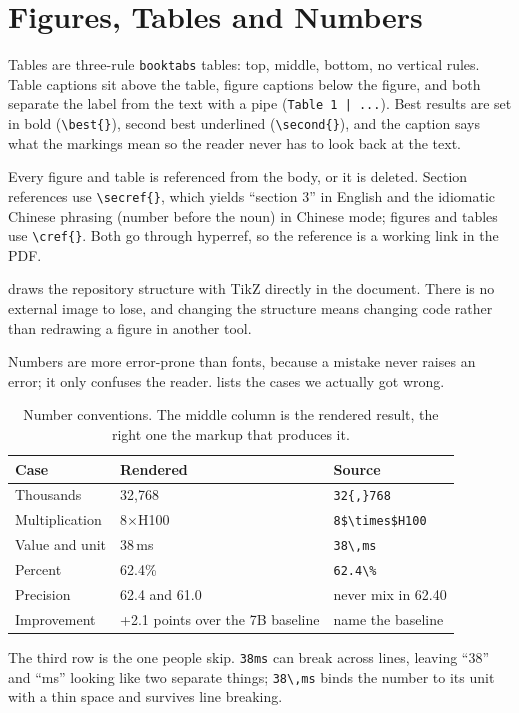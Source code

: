 \section{Figures, Tables and Numbers}
\label{sec:figure}

Tables are three-rule \texttt{booktabs} tables: top, middle, bottom, no vertical rules.
Table captions sit above the table, figure captions below the figure, and both separate
the label from the text with a pipe (\texttt{Table 1 | ...}). Best results are set in
bold (\verb|\best{}|), second best underlined (\verb|\second{}|), and the caption says
what the markings mean so the reader never has to look back at the text.

Every figure and table is referenced from the body, or it is deleted. Section references
use \verb|\secref{}|, which yields ``section 3'' in English and the idiomatic
Chinese phrasing (number before the noun) in Chinese mode; figures and tables use
\verb|\cref{}|. Both go through hyperref, so the reference is a working link in the PDF.

 draws the repository structure with TikZ directly in the document. There
is no external image to lose, and changing the structure means changing code rather than
redrawing a figure in another tool.



Numbers are more error-prone than fonts, because a mistake never raises an error; it only
confuses the reader.  lists the cases we actually got wrong.

\begin{table}[htbp]
  \centering
  \small
  \caption{Number conventions. The middle column is the rendered result, the right one
  the markup that produces it.}
  \label{tab:numbers}
  \begin{tabular}{@{}lll@{}}
    \toprule
    Case & Rendered & Source \\
    \midrule
    Thousands      & 32,768        & \texttt{32\{,\}768} \\
    Multiplication & 8$\times$H100 & \texttt{8\$\textbackslash times\$H100} \\
    Value and unit & 38\,ms        & \texttt{38\textbackslash,ms} \\
    Percent        & 62.4\%        & \texttt{62.4\textbackslash\%} \\
    Precision      & 62.4 and 61.0 & never mix in 62.40 \\
    Improvement    & +2.1 points over the 7B baseline & name the baseline \\
    \bottomrule
  \end{tabular}
\end{table}

The third row is the one people skip. \texttt{38ms} can break across lines, leaving
``38'' and ``ms'' looking like two separate things; \verb|38\,ms| binds the number to its
unit with a thin space and survives line breaking.
